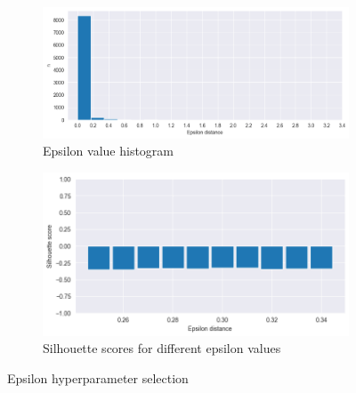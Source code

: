 \begin{figure}[H]
    \hspace*{\fill}
    \centering
    \begin{subfigure}[b]{0.45\textwidth}
        \centering
        \includegraphics[width=1.0\textwidth]{src/figs/epsilon_histogram.png} 
        \caption{Epsilon value histogram}\label{fig:epsilon_histogram}
    \end{subfigure}
    \hfill
    \begin{subfigure}[b]{0.45\textwidth}
        \centering
        \includegraphics[width=1.0\textwidth]{src/figs/silhouette_epsilon.png} 
        \caption{Silhouette scores for different epsilon values}\label{fig:silhouette_epsilon}
    \end{subfigure}
    \caption{Epsilon hyperparameter selection}\label{fig:hyperparameters_dbscan}
    \hspace*{\fill}
\end{figure}

